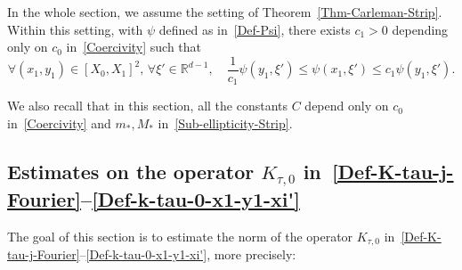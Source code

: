 \documentclass[10pt]{amsart}
\theoremstyle{definition}\newtheorem{defi}[theo]{Definition}\newtheorem{rema}[theo]{Remark}\newtheorem{exam}[theo]{Example}\newtheorem{exem}[theo]{Example}\newtheorem{nota}[theo]{Notation}
\newcommand*\R{\mathbb{R}}
\renewcommand{\leq}{\leqslant}
\let\oldforall\forall
\renewcommand*{\forall}{\mathrel{\oldforall}}
\begin{document}
In the whole section, we assume the setting of Theorem~\ref{Thm-Carleman-Strip}. Within this setting, with $\psi$ defined as in~\eqref{Def-Psi}, there exists $c_1 >0$ depending only on $c_0$ in~\eqref{Coercivity} such that
\begin{equation}\label{Equivalences-Psi-x-xi}
\forall (x_1,y_1) \in [X_0,X_1]^2,\, \forall \xi' \in \R^{d-1},
\quad
\frac{1}{c_1} \psi(y_1,\xi') \leq \psi(x_1, \xi') \leq c_1 \psi(y_1,\xi').
\end{equation}

We also recall that in this section, all the constants $C$ depend only on $c_0$ in~\eqref{Coercivity} and $m_*, M_*$ in~\eqref{Sub-ellipticity-Strip}.



\subsection{Estimates on the operator \texorpdfstring{$K_{\tau, 0}$}{K tau, 0} in~\eqref{Def-K-tau-j-Fourier}--\eqref{Def-k-tau-0-x1-y1-xi'}}

The goal of this section is to estimate the norm of the operator $K_{\tau, 0}$ in~\eqref{Def-K-tau-j-Fourier}--\eqref{Def-k-tau-0-x1-y1-xi'}, more precisely:
\end{document}
